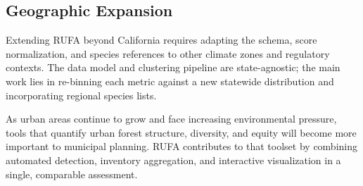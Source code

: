 \subsection{Geographic Expansion}

Extending RUFA beyond California requires adapting the schema, score normalization, and species references to other climate zones and regulatory contexts. The data model and clustering pipeline are state-agnostic; the main work lies in re-binning each metric against a new statewide distribution and incorporating regional species lists.

As urban areas continue to grow and face increasing environmental pressure, tools that quantify urban forest structure, diversity, and equity will become more important to municipal planning. RUFA contributes to that toolset by combining automated detection, inventory aggregation, and interactive visualization in a single, comparable assessment.
